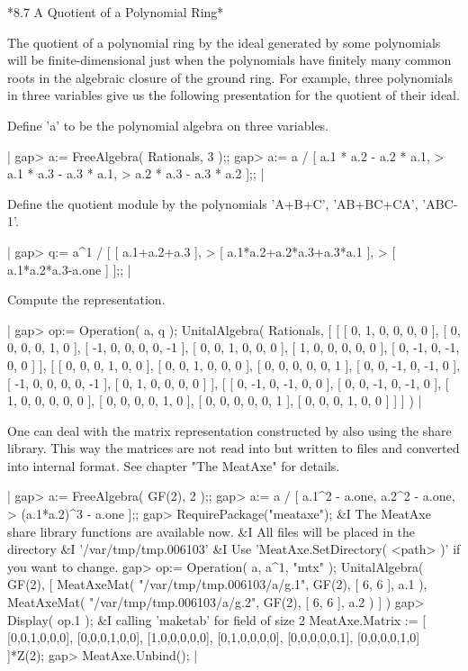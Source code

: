 \vspace{5mm}

*8.7 A Quotient of a Polynomial Ring*

The quotient of a polynomial ring by the ideal generated by some polynomials
will be finite-dimensional just when the polynomials have finitely many common
roots in the algebraic closure of the ground ring.
For example, three polynomials in three variables give us the following
presentation for the quotient of their ideal.

Define 'a' to be the polynomial algebra on three variables.

|    gap> a:= FreeAlgebra( Rationals, 3 );;
    gap> a:= a / [ a.1 * a.2 - a.2 * a.1,
    >              a.1 * a.3 - a.3 * a.1,
    >              a.2 * a.3 - a.3 * a.2 ];; |
    
Define the quotient module by the polynomials 'A+B+C', 'AB+BC+CA', 'ABC-1'.

|    gap> q:= a^1 / [ [ a.1+a.2+a.3 ],
    >                [ a.1*a.2+a.2*a.3+a.3*a.1 ],
    >                [ a.1*a.2*a.3-a.one ]        ];; |
    
Compute the representation.

|    gap> op:= Operation( a, q );
    UnitalAlgebra( Rationals, 
    [ [ [ 0, 1, 0, 0, 0, 0 ], [ 0, 0, 0, 0, 1, 0 ],
          [ -1, 0, 0, 0, 0, -1 ], [ 0, 0, 1, 0, 0, 0 ],
          [ 1, 0, 0, 0, 0, 0 ], [ 0, -1, 0, -1, 0, 0 ] ],
      [ [ 0, 0, 0, 1, 0, 0 ], [ 0, 0, 1, 0, 0, 0 ], [ 0, 0, 0, 0, 0, 1 ],
          [ 0, 0, -1, 0, -1, 0 ], [ -1, 0, 0, 0, 0, -1 ],
          [ 0, 1, 0, 0, 0, 0 ] ],
      [ [ 0, -1, 0, -1, 0, 0 ], [ 0, 0, -1, 0, -1, 0 ],
          [ 1, 0, 0, 0, 0, 0 ], [ 0, 0, 0, 0, 1, 0 ],
          [ 0, 0, 0, 0, 0, 1 ], [ 0, 0, 0, 1, 0, 0 ] ] ] ) |
    

One can deal with the matrix representation constructed by {\VE} also using
the {\MeatAxe} share library.  This way the matrices are not read into {\GAP}
but written to files and converted into internal {\MeatAxe} format.
See chapter "The MeatAxe" for details.

|    gap> a:= FreeAlgebra( GF(2), 2 );;
    gap> a:= a / [ a.1^2 - a.one, a.2^2 - a.one,
    >              (a.1*a.2)^3 - a.one ];;
    gap> RequirePackage("meataxe");
    &I  The MeatAxe share library functions are available now.
    &I  All files will be placed in the directory
    &I     '/var/tmp/tmp.006103'
    &I  Use 'MeatAxe.SetDirectory( <path> )' if you want to change.
    gap> op:= Operation( a, a^1, "mtx" );
    UnitalAlgebra( GF(2), 
    [ MeatAxeMat( "/var/tmp/tmp.006103/a/g.1", GF(2), [ 6, 6 ], a.1 ),
      MeatAxeMat( "/var/tmp/tmp.006103/a/g.2", GF(2), [ 6, 6 ], a.2 ) ] )
    gap> Display( op.1 );
    &I  calling 'maketab' for field of size 2
    MeatAxe.Matrix := [
    [0,0,1,0,0,0],
    [0,0,0,1,0,0],
    [1,0,0,0,0,0],
    [0,1,0,0,0,0],
    [0,0,0,0,0,1],
    [0,0,0,0,1,0]
    ]*Z(2);
    gap> MeatAxe.Unbind(); |

